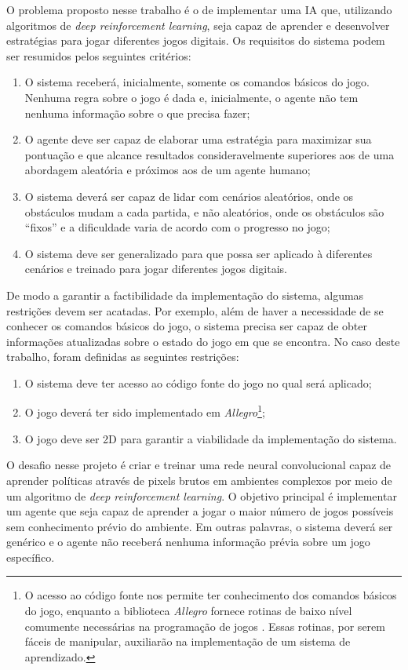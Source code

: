  O problema proposto nesse trabalho é o de implementar uma IA que, utilizando algoritmos de \textit{deep reinforcement learning}, seja capaz de aprender e desenvolver estratégias para jogar diferentes jogos digitais. Os requisitos do sistema podem ser resumidos pelos seguintes critérios:
\begin{enumerate}
	\item O sistema receberá, inicialmente, somente os comandos básicos do jogo. Nenhuma regra sobre o jogo é dada e, inicialmente, o agente não tem nenhuma informação sobre o que precisa fazer;
	\item O agente deve ser capaz de elaborar uma estratégia para maximizar sua pontuação e que alcance resultados consideravelmente superiores aos de uma abordagem aleatória e próximos aos de um agente humano;
	\item O sistema deverá ser capaz de lidar com cenários aleatórios, onde os obstáculos mudam a cada partida, e não aleatórios, onde os obstáculos são ``fixos'' e a dificuldade varia de acordo com o progresso no jogo;
	\item O sistema deve ser generalizado para que possa ser aplicado à diferentes cenários e treinado para jogar diferentes jogos digitais.
\end{enumerate}

De modo a garantir a factibilidade da implementação do sistema, algumas restrições devem ser acatadas. Por exemplo, além de haver a necessidade de se conhecer os comandos básicos do jogo, o sistema precisa ser capaz de obter informações atualizadas sobre o estado do jogo em que se encontra. No caso deste trabalho, foram definidas as seguintes restrições:

\begin{enumerate}
	\item O sistema deve ter acesso ao código fonte do jogo no qual será aplicado;
	\item O jogo deverá ter sido implementado em \textit{Allegro}\footnote{O acesso ao código fonte nos permite ter conhecimento dos comandos básicos do jogo, enquanto a biblioteca \textit{Allegro} fornece rotinas de baixo nível comumente necessárias na programação de jogos \cite{allegro}. Essas rotinas, por serem fáceis de manipular, auxiliarão na implementação de um sistema de aprendizado.};
	\item O jogo deve ser 2D para garantir a viabilidade da implementação do sistema.
\end{enumerate}

O desafio nesse projeto é criar e treinar uma rede neural convolucional capaz de aprender políticas através de pixels brutos em ambientes complexos por meio de um algoritmo de \textit{deep reinforcement learning}. O objetivo principal é implementar um agente que seja capaz de aprender a jogar o maior número de jogos possíveis sem conhecimento prévio do ambiente. Em outras palavras, o sistema deverá ser genérico e o agente não receberá nenhuma informação prévia sobre um jogo específico.

